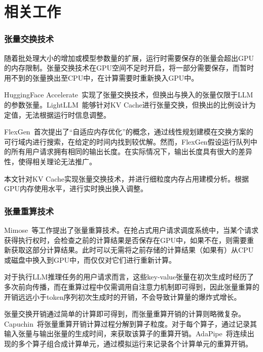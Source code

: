 \section{相关工作}

\subsubsection{张量交换技术}

随着批处理大小的增加或模型参数量的扩展，运行时需要保存的张量会超出GPU的内存限制。张量交换技术在GPU空间不足时开启，将一部分需要保存，而暂时用不到的张量换出至CPU中，在计算需要时重新换入GPU中。

HuggingFace Accelerate~\cite{Huggingface-Accelerate}实现了张量交换技术，但换出与换入的张量仅限于LLM的参数张量。LightLLM~\cite{LightLLM}能够针对KV Cache进行张量交换，但换出的比例设计为定值，无法根据运行时信息调整。

FlexGen~\cite{Swapping}首次提出了“自适应内存优化”的概念，通过线性规划建模在交换方案的可行域内进行搜索，在给定的时间内找到较优解。然而，FlexGen假设运行队列中的所有用户请求拥有相同的输出长度。在实际情况下，输出长度具有很大的差异性，使得相关理论无法推广。

本文针对KV Cache实现张量交换技术，并进行细粒度内存占用建模分析。根据GPU内存使用水平，进行实时换出换入调整。

\subsubsection{张量重算技术}

Mimose~\cite{Recomputation, Recomp_2, Recomp_3}等工作提出了张量重算技术。在抢占式用户请求调度系统中，当某个请求获得执行权时，会检查之前的计算结果是否保存在GPU中，如果不在，则需要重新获取这部分计算结果。此时可以无需将之前存储的计算结果（如果有）从CPU或磁盘中换入到GPU中，而仅仅对它们进行重新计算。

对于执行LLM推理任务的用户请求而言，这些key-value张量在初次生成时经历了多次前向传播，而在重算过程中仅需调用自注意力机制即可得到，因此张量重算的开销远远小于token序列初次生成时的开销，不会导致计算量的爆炸式增长。

{\color{red}张量交换开销通过简单的计算即可得到，而张量重算开销的计算则略微复杂。Capuchin~\cite{Capuchin}将张量重算开销计算过程分解到算子粒度。对于每个算子，通过记录其输入张量与输出张量的生成时间，来获取该算子的重算开销。AdaPipe~\cite{AdaPipe}将连续出现的多个算子组合成计算单元，通过模拟运行来记录各个计算单元的重算开销。}

